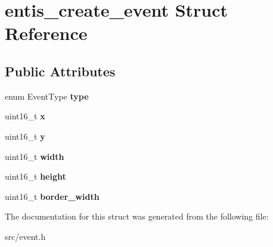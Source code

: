 \hypertarget{structentis__create__event}{}\section{entis\+\_\+create\+\_\+event Struct Reference}
\label{structentis__create__event}
\subsection*{Public Attributes}
\begin{DoxyCompactItemize}
\item 
\mbox{\label{structentis__create__event_a9d14d11bdf34f3f0adec7c9d05ae3d72}} 
enum Event\+Type {\bfseries type}
\item 
\mbox{\label{structentis__create__event_a683c3709ae27e32fafa1b3ef0b5cedda}} 
uint16\+\_\+t {\bfseries x}
\item 
\mbox{\label{structentis__create__event_aa917a9588ccd4e1b81172a88c8a31434}} 
uint16\+\_\+t {\bfseries y}
\item 
\mbox{\label{structentis__create__event_adff2dc36834030fa2c1921376faee801}} 
uint16\+\_\+t {\bfseries width}
\item 
\mbox{\label{structentis__create__event_a6b47465aec3646d05e948a692ec63c64}} 
uint16\+\_\+t {\bfseries height}
\item 
\mbox{\label{structentis__create__event_aa678bab73d1108d0a05480f7c539b88e}} 
uint16\+\_\+t {\bfseries border\+\_\+width}
\end{DoxyCompactItemize}


The documentation for this struct was generated from the following file\+:\begin{DoxyCompactItemize}
\item 
src/event.\+h\end{DoxyCompactItemize}
